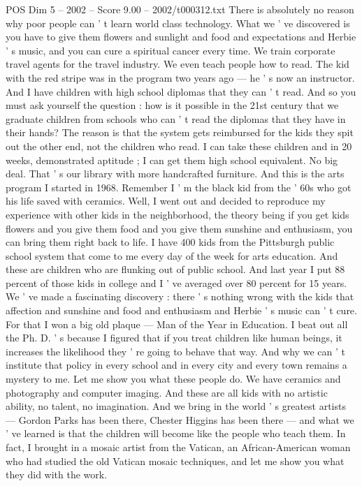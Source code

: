 \begin{textsample}{POS Dim 5 – 2002 – Score 9.00 – 2002/t000312.txt}
There is absolutely no reason why poor people can ' t learn world class technology.
What we ' ve discovered is you have to give them flowers and sunlight and food and expectations and Herbie ' s music, and you can cure a spiritual cancer every time.
We train corporate travel agents for the travel industry.
We even teach people how to read.
The kid with the red stripe was in the program two years ago — he ' s now an instructor.
And I have children with high school diplomas that they can ' t read.
And so you must ask yourself the question : how is it possible in the 21st century that we graduate children from schools who can ' t read the diplomas that they have in their hands?
The reason is that the system gets reimbursed for the kids they spit out the other end, not the children who read.
I can take these children and in 20 weeks, demonstrated aptitude ; I can get them high school equivalent.
No big deal.
That ' s our library with more handcrafted furniture.
And this is the arts program I started in 1968.
Remember I ' m the black kid from the ' 60s who got his life saved with ceramics.
Well, I went out and decided to reproduce my experience with other kids in the neighborhood, the theory being if you get kids flowers and you give them food and you give them sunshine and enthusiasm, you can bring them right back to life.
I have 400 kids from the Pittsburgh public school system that come to me every day of the week for arts education.
And these are children who are flunking out of public school.
And last year I put 88 percent of those kids in college and I ' ve averaged over 80 percent for 15 years.
We ' ve made a fascinating discovery : there ' s nothing wrong with the kids that affection and sunshine and food and enthusiasm and Herbie ' s music can ' t cure.
For that I won a big old plaque — Man of the Year in Education.
I beat out all the Ph.
D. ' s because I figured that if you treat children like human beings, it increases the likelihood they ' re going to behave that way.
And why we can ' t institute that policy in every school and in every city and every town remains a mystery to me.
Let me show you what these people do.
We have ceramics and photography and computer imaging.
And these are all kids with no artistic ability, no talent, no imagination.
And we bring in the world ' s greatest artists — Gordon Parks has been there, Chester Higgins has been there — and what we ' ve learned is that the children will become like the people who teach them.
In fact, I brought in a mosaic artist from the Vatican, an African-American woman who had studied the old Vatican mosaic techniques, and let me show you what they did with the work.

\end{textsample}

